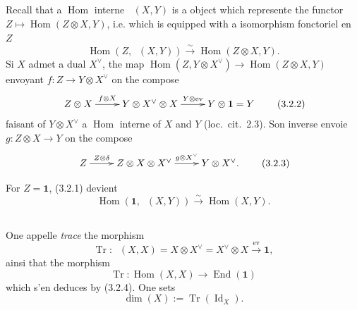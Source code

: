 \documentclass[11pt,a4paper]{article}
\theoremstyle{plain}
\theoremstyle{definition}
\DeclareMathOperator{\Hom}{Hom}
\DeclareMathOperator{\End}{End}
\DeclareMathOperator{\Tr}{Tr}
\newcommand{\isom}{\xrightarrow{\sim}}
\newcommand{\ev}{\mathrm{ev}}
\DeclareMathOperator{\Id}{Id}
\DeclareMathOperator{\iHom}{\underline{Hom}}
\begin{document}
\subsection{}
Recall that a $\Hom$ interne $\iHom(X, Y)$ is a object which represente the functor $Z \mapsto \Hom(Z \otimes X, Y)$, i.e. which is equipped with a isomorphism fonctoriel en $Z$
\begin{equation}
\Hom(Z, \iHom(X, Y)) \isom \Hom(Z \otimes X, Y). \tag{3.2.1}
\end{equation}
Si $X$ admet a dual $X^\vee$, the map $\Hom(Z, Y \otimes X^\vee) \to \Hom(Z \otimes X, Y)$ envoyant $f : Z \to Y \otimes X^\vee$ on the compose
\begin{equation}
\xymatrix{
Z \otimes X \ar[r]^-{f \otimes X} & Y \otimes X^\vee \otimes X \ar[r]^-{Y \otimes \ev} & Y \otimes \mathbf{1} = Y
} \tag{3.2.2}
\end{equation}
faisant of $Y \otimes X^\vee$ a $\Hom$ interne of $X$ and $Y$ (loc.~cit.~2.3). Son inverse envoie $g : Z \otimes X \to Y$ on the compose
\begin{equation}
\xymatrix{
Z \ar[r]^-{Z \otimes \delta} & Z \otimes X \otimes X^\vee \ar[r]^-{g \otimes X^\vee} & Y \otimes X^\vee.
} \tag{3.2.3}
\end{equation}

For $Z = \mathbf{1}$, (3.2.1) devient
\begin{equation}
\Hom(\mathbf{1}, \iHom(X, Y)) \isom \Hom(X, Y). \tag{3.2.4}
\end{equation}

\subsection{}
One appelle \emph{trace} the morphism
\begin{equation}
\Tr : \iHom(X, X) = X \otimes X^\vee = X^\vee \otimes X \xrightarrow{\ev} \mathbf{1}, \tag{3.3.1}
\end{equation}
ainsi that the morphism
\begin{equation}
\Tr : \Hom(X, X) \to \End(\mathbf{1}) \tag{3.3.2}
\end{equation}
which s'en deduces by (3.2.4). One sets
\begin{equation}
\dim(X) := \Tr(\Id_X). \tag{3.3.3}
\end{equation}
\end{document}
